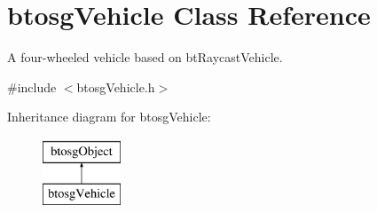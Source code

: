 \hypertarget{classbtosgVehicle}{}\section{btosg\+Vehicle Class Reference}
\label{classbtosgVehicle}


A four-\/wheeled vehicle based on bt\+Raycast\+Vehicle.  




{\ttfamily \#include $<$btosg\+Vehicle.\+h$>$}

Inheritance diagram for btosg\+Vehicle\+:\begin{figure}[H]
\begin{center}
\leavevmode
\includegraphics[height=2.000000cm]{classbtosgVehicle}
\end{center}
\end{figure}
